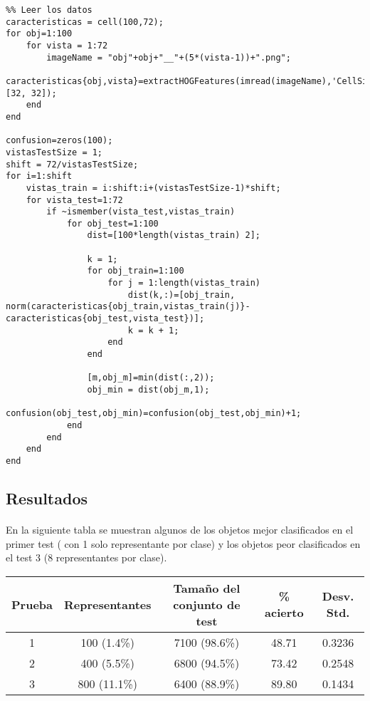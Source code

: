 \documentclass[es,gi]{ifirak}\usepackage[]{graphicx}\usepackage[]{color}
\begin{document}
\begin{lstlisting}
%% Leer los datos
caracteristicas = cell(100,72);
for obj=1:100
    for vista = 1:72
        imageName = "obj"+obj+"__"+(5*(vista-1))+".png";
        caracteristicas{obj,vista}=extractHOGFeatures(imread(imageName),'CellSize',[32, 32]);
    end
end

confusion=zeros(100);
vistasTestSize = 1;
shift = 72/vistasTestSize;
for i=1:shift
    vistas_train = i:shift:i+(vistasTestSize-1)*shift;
    for vista_test=1:72
        if ~ismember(vista_test,vistas_train)
            for obj_test=1:100
                dist=[100*length(vistas_train) 2];
                
                k = 1;
                for obj_train=1:100
                    for j = 1:length(vistas_train)
                        dist(k,:)=[obj_train, norm(caracteristicas{obj_train,vistas_train(j)}-caracteristicas{obj_test,vista_test})];
                        k = k + 1;
                    end
                end

                [m,obj_m]=min(dist(:,2));
                obj_min = dist(obj_m,1);
                confusion(obj_test,obj_min)=confusion(obj_test,obj_min)+1;
            end
        end
    end
end
\end{lstlisting}

\pagebreak
\subsection{Resultados}
\paragraph{} 

En la siguiente tabla se muestran algunos de los objetos mejor clasificados en el primer test ( con 1 solo representante por clase) y los objetos peor clasificados en el test 3 (8 representantes por clase).\\

\begin{tabular}{ccccc}
 \toprule
	\bfseries Prueba &
    \bfseries Representantes &
	\bfseries Tamaño del conjunto de test &
	\bfseries \% acierto  &
	\bfseries Desv. Std.\\
 \midrule
	1 & 100 (1.4\%) & 7100 (98.6\%) & 48.71 & 0.3236 \\
	2 & 400 (5.5\%) & 6800 (94.5\%) & 73.42 &  0.2548\\
	3 & 800 (11.1\%) & 6400 (88.9\%) & 89.80 & 0.1434\\
 \bottomrule
\end{tabular}
\end{document}
